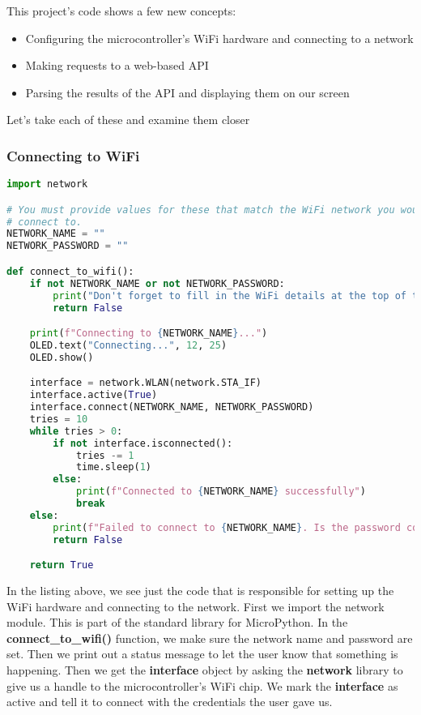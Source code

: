 This project's code shows a few new concepts:
\begin{itemize}
    \item Configuring the microcontroller's WiFi hardware and connecting to a network
    \item Making requests to a web-based API
    \item Parsing the results of the API and displaying them on our screen
\end{itemize}

Let's take each of these and examine them closer

\subsubsection{Connecting to WiFi}
\begin{lstlisting}[language=Python,caption=WiFi Code]
import network

# You must provide values for these that match the WiFi network you would like to
# connect to.
NETWORK_NAME = ""
NETWORK_PASSWORD = ""

def connect_to_wifi():
    if not NETWORK_NAME or not NETWORK_PASSWORD:
        print("Don't forget to fill in the WiFi details at the top of the script!")
        return False

    print(f"Connecting to {NETWORK_NAME}...")
    OLED.text("Connecting...", 12, 25)
    OLED.show()

    interface = network.WLAN(network.STA_IF)
    interface.active(True)
    interface.connect(NETWORK_NAME, NETWORK_PASSWORD)
    tries = 10
    while tries > 0:
        if not interface.isconnected():
            tries -= 1
            time.sleep(1)
        else:
            print(f"Connected to {NETWORK_NAME} successfully")
            break
    else:
        print(f"Failed to connect to {NETWORK_NAME}. Is the password correct?")
        return False

    return True
\end{lstlisting}

In the listing above, we see just the code that is responsible for setting up the WiFi hardware and connecting
to the network. First we import the network module. This is part of the standard library for MicroPython.
In the \textbf{connect\_to\_wifi()} function, we make sure the network name and password are set. Then
we print out a status message to let the user know that something is happening. Then we get the \textbf{interface}
object by asking the \textbf{network} library to give us a handle to the microcontroller's WiFi chip. We mark
the \textbf{interface} as active and tell it to connect with the credentials the user gave us.

